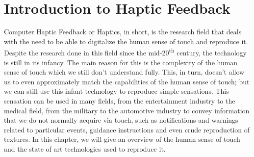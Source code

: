 \section{Introduction to Haptic Feedback}
\label{Introduction_Haptics}
Computer Haptic Feedback or Haptics, in short, is the research field that deals with the need to be able to digitalize the human sense of touch and reproduce it. Despite the research done in this field since the mid-20\textsuperscript{th} century, the technology is still in its infancy. The main reason for this is the complexity of the human sense of touch which we still don't understand fully.
This, in turn, doesn't allow us to even approximately match the capabilities of the human sense of touch; but we can still use this infant technology to reproduce simple sensations.
This sensation can be used in many fields, from the entertainment industry to the medical field, from the military to the automotive industry to convey information that we do not normally acquire via touch, such as notifications
and warnings related to particular events, guidance instructions and even crude reproduction of textures.
In this chapter, we will give an overview of the human sense of touch and the state of art technologies used to reproduce it.






